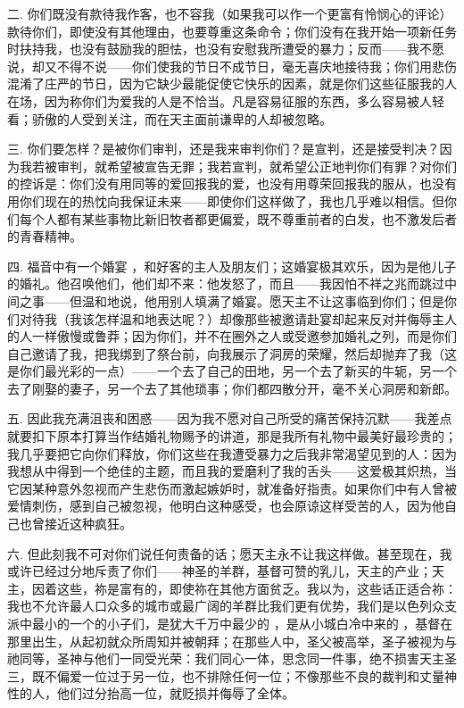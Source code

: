 二. 你们既没有款待我作客，也不容我（如果我可以作一个更富有怜悯心的评论）款待你们，即使没有其他理由，也要尊重这条命令；你们没有在我开始一项新任务时扶持我，也没有鼓励我的胆怯，也没有安慰我所遭受的暴力；反而——我不愿说，却又不得不说——你们使我的节日不成节日，毫无喜庆地接待我；你们用悲伤混淆了庄严的节日，因为它缺少最能促使它快乐的因素，就是你们这些征服我的人在场，因为称你们为爱我的人是不恰当。凡是容易征服的东西，多么容易被人轻看；骄傲的人受到关注，而在天主面前谦卑的人却被忽略。\par

三. 你们要怎样？是被你们审判，还是我来审判你们？是宣判，还是接受判决？因为我若被审判，就希望被宣告无罪；我若宣判，就希望公正地判你们有罪？对你们的控诉是：你们没有用同等的爱回报我的爱，也没有用尊荣回报我的服从，也没有用你们现在的热忱向我保证未来——即使你们这样做了，我也几乎难以相信。但你们每个人都有某些事物比新旧牧者都更偏爱，既不尊重前者的白发，也不激发后者的青春精神。\par

四. 福音中有一个婚宴 ，和好客的主人及朋友们；这婚宴极其欢乐，因为是他儿子的婚礼。他召唤他们，他们却不来：他发怒了，而且——我因怕不祥之兆而跳过中间之事——但温和地说，他用别人填满了婚宴。愿天主不让这事临到你们；但是你们对待我（我该怎样温和地表达呢？）却像那些被邀请赴宴却起来反对并侮辱主人的人一样傲慢或鲁莽；因为你们，并不在圈外之人或受邀参加婚礼之列，而是你们自己邀请了我，把我绑到了祭台前，向我展示了洞房的荣耀，然后却抛弃了我（这是你们最光彩的一点）——一个去了自己的田地，另一个去了新买的牛轭，另一个去了刚娶的妻子，另一个去了其他琐事；你们都四散分开，毫不关心洞房和新郎。\par

五. 因此我充满沮丧和困惑——因为我不愿对自己所受的痛苦保持沉默——我差点就要扣下原本打算当作结婚礼物赐予的讲道，那是我所有礼物中最美好最珍贵的；我几乎要把它向你们释放，你们这些在我遭受暴力之后我非常渴望见到的人：因为我想从中得到一个绝佳的主题，而且我的爱磨利了我的舌头——这爱极其炽热，当它因某种意外忽视而产生悲伤而激起嫉妒时，就准备好指责。如果你们中有人曾被爱情刺伤，感到自己被忽视，他明白这种感受，也会原谅这样受苦的人，因为他自己也曾接近这种疯狂。\par

六. 但此刻我不可对你们说任何责备的话；愿天主永不让我这样做。甚至现在，我或许已经过分地斥责了你们——神圣的羊群，基督可赞的乳儿，天主的产业；天主，因着这些，祢是富有的，即使祢在其他方面贫乏。我以为，这些话正适合祢：我也不允许最人口众多的城市或最广阔的羊群比我们更有优势，我们是以色列众支派中最小的一个的小子们，是犹大千万中最少的 ，是从小城白冷中来的 ，基督在那里出生，从起初就众所周知并被朝拜；在那些人中，圣父被高举，圣子被视为与祂同等，圣神与他们一同受光荣：我们同心一体，思念同一件事，绝不损害天主圣三，既不偏爱一位过于另一位，也不排除任何一位；不像那些不良的裁判和丈量神性的人，他们过分抬高一位，就贬损并侮辱了全体。\par

